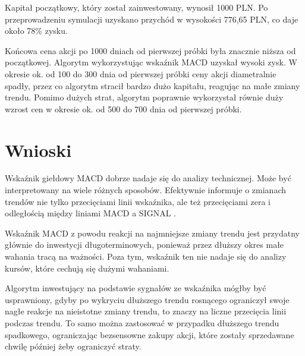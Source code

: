 \documentclass{article}
\begin{document}
Kapitał początkowy, który został zainwestowany, wynosił 1000 PLN. Po przeprowadzeniu symulacji uzyskano przychód w wysokości 776,65 PLN, co daje około 78\% zysku.

Końcowa cena akcji po 1000 dniach od pierwszej próbki była znacznie niższa od początkowej. Algorytm wykorzystując wskaźnik MACD uzyskał wysoki zysk. W okresie ok. od 100 do 300 dnia od pierwszej próbki ceny akcji diametralnie spadły, przez co algorytm stracił bardzo dużo kapitału, reagując na małe zmiany trendu. Pomimo dużych strat, algorytm poprawnie wykorzystał równie duży wzrost cen w okresie ok. od 500 do 700 dnia od pierwszej próbki.

\newpage
\section{Wnioski}

Wskaźnik giełdowy MACD dobrze nadaje się do analizy technicznej. Może być interpretowany na wiele różnych sposobów. Efektywnie informuje o zmianach trendów nie tylko przecięciami linii wskaźnika, ale też przecięciami zera i odległością między liniami MACD a SIGNAL \cite{web:trading_interpretation}. 

Wskaźnik MACD z powodu reakcji na najmniejsze zmiany trendu jest przydatny głównie do inwestycji długoterminowych, ponieważ przez dłuższy okres małe wahania tracą na ważności. Poza tym, wskaźnik ten nie nadaje się do analizy kursów, które cechują się dużymi wahaniami.

Algorytm inwestujący na podstawie sygnałów ze wskaźnika mógłby być usprawniony, gdyby po wykryciu dłuższego trendu rosnącego ograniczył swoje nagłe reakcje na nieistotne zmiany trendu, to znaczy na liczne przecięcia linii podczas trendu. To samo można zastosować w przypadku dłuższego trendu spadkowego, ograniczając bezsensowne zakupy akcji, które zostały sprzedawane chwilę później żeby ograniczyć straty.



\end{document}

